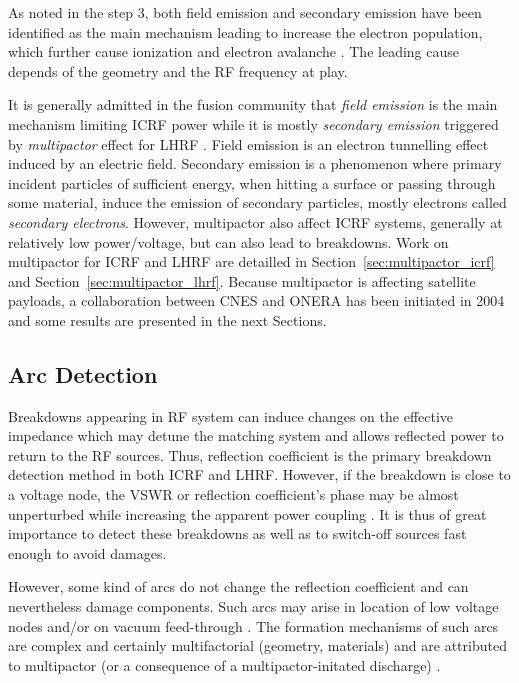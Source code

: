 As noted in the step 3, both field emission and secondary emission have been identified as the main mechanism leading to increase the electron population, which further cause ionization and electron avalanche . The leading cause depends of the geometry and the RF frequency at play. 

It is generally admitted in the fusion community that \textit{field emission} is the main mechanism limiting ICRF power while it is mostly  \textit{secondary emission} triggered by \textit{multipactor} effect for LHRF . Field emission is an electron tunnelling effect induced by an electric field. Secondary emission is a phenomenon where primary incident particles of sufficient energy, when hitting a surface or passing through some material, induce the emission of secondary particles, mostly electrons called \textit{secondary electrons}. However, multipactor also affect ICRF systems, generally at relatively low power/voltage, but can also lead to breakdowns. Work on multipactor for ICRF and LHRF are detailled in Section~\ref{sec:multipactor_icrf} and Section~\ref{sec:multipactor_lhrf}. Because multipactor is affecting satellite payloads, a collaboration between CNES and ONERA has been initiated in 2004 and some results are presented in the next Sections.



\subsection{Arc Detection}
Breakdowns appearing in RF system can induce changes on the effective impedance which may detune the matching system and allows reflected power to return to the RF sources. Thus, reflection coefficient is the primary breakdown detection method in both ICRF and LHRF. However, if the breakdown is close to a voltage node, the VSWR or reflection coefficient’s phase may be almost unperturbed while increasing the apparent power coupling . It is thus of great importance to detect these breakdowns as well as to switch-off sources fast enough to avoid damages. 

However, some kind of arcs do not change the reflection coefficient and can nevertheless damage components. Such arcs may arise in location of low voltage nodes and/or on vacuum feed-through . The formation mechanisms of such arcs are complex and certainly multifactorial (geometry, materials) and are attributed to multipactor (or a consequence of a multipactor-initated discharge) . 

